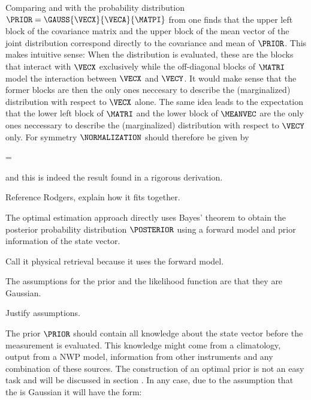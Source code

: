        Comparing  and 
        with the probability distribution $\PRIOR
        = \GAUSS{\VECX}{\VECA}{\MATPI}$ from  one finds
        that the upper left block of the covariance matrix and the upper block
        of the mean vector of the joint distribution correspond directly to the
        covariance and mean of $\PRIOR$. This makes intuitive sense: When the
        distribution is evaluated, these are the blocks that interact with
        $\VECX$ exclusively while the off-diagonal blocks of $\MATRI$ model the
        interaction between $\VECX$ and $\VECY$. It would make sense that the
        former blocks are then the only ones neccesary to describe the
        (marginalized) distribution with respect to $\VECX$ alone. The same
        idea leads to the expectation that the lower left block of $\MATRI$ and
        the lower block of $\MEANVEC$ are the only ones neccessary to describe
        the (marginalized) distribution with respect to $\VECY$ only. For
        symmetry $\NORMALIZATION$ should therefore be given by
        
        \placeformula[eq:bayesgaussnorm]
        \startformula
            \NORMALIZATION = \GAUSS{\VECY}{\MATB \VECA + \VECB}{\MATQI + \MATB \MATP \MATBT} \EQCOMMA
        \stopformula

        and this is indeed the result found in a rigorous derivation.

    \stopsubsection

\stopsection


\startsection[title={Optimal Estimation},reference=ch:optimalestimation]

    Reference Rodgers, explain how it fits together.

    The optimal estimation approach directly uses Bayes' theorem
     to obtain the posterior probability distribution
    $\POSTERIOR$ using a forward model and prior information of the state
    vector.

    Call it physical retrieval because it uses the forward model.

    The assumptions for the prior {\PDF} and the likelihood function
    are that they are Gaussian.

    Justify assumptions.

    The prior $\PRIOR$ should contain all knowledge about the state vector
    before the measurement is evaluated. This knowledge might come from
    a climatology, output from a NWP model, information from other instruments
    and any combination of these sources. The construction of an optimal prior
    is not an easy task and will be discussed in section
    . In any case, due to the assumption that the
    {\PDF} is Gaussian it will have the form:

